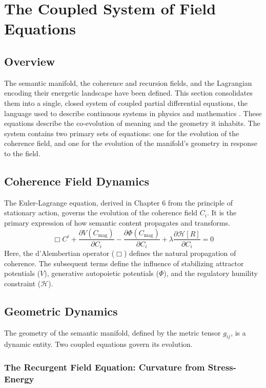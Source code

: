 \chapter{The Coupled System of Field Equations}

\section{Overview}

The semantic manifold, the coherence and recursion fields, and the Lagrangian encoding their energetic landscape have been defined. This section consolidates them into a single, closed system of coupled partial differential equations, the language used to describe continuous systems in physics and mathematics \autocite{Evans2010}. These equations describe the co-evolution of meaning and the geometry it inhabits. The system contains two primary sets of equations: one for the evolution of the coherence field, and one for the evolution of the manifold's geometry in response to the field.

\section{Coherence Field Dynamics}

The Euler-Lagrange equation, derived in Chapter 6 from the principle of stationary action, governs the evolution of the coherence field \(C_i\). It is the primary expression of how semantic content propagates and transforms.
\begin{equation}
\Box C^i + \frac{\partial V(C_{\mathrm{mag}})}{\partial C_i} - \frac{\partial \Phi(C_{\mathrm{mag}})}{\partial C_i} + \lambda \frac{\partial \mathcal{H}[R]}{\partial C_i} = 0
\end{equation}
Here, the d'Alembertian operator (\(\Box\)) defines the natural propagation of coherence. The subsequent terms define the influence of stabilizing attractor potentials (\(V\)), generative autopoietic potentials (\(\Phi\)), and the regulatory humility constraint (\(\mathcal{H}\)).

\section{Geometric Dynamics}

The geometry of the semantic manifold, defined by the metric tensor \(g_{ij}\), is a dynamic entity. Two coupled equations govern its evolution.

\subsection{The Recurgent Field Equation: Curvature from Stress-Energy}

